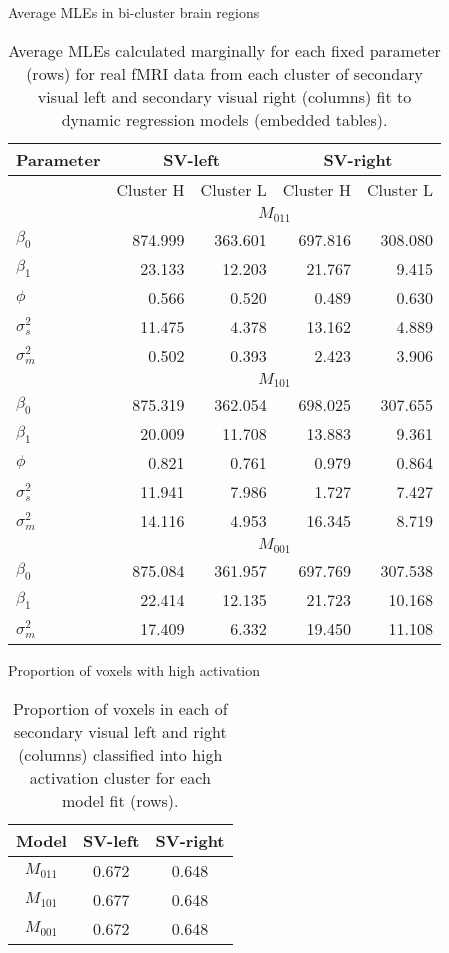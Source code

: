 \begin{table}
\ssp
\centering
\caption{Average MLEs in bi-cluster brain regions} \label{tab:fmri:mle:clusters}
\begin{tabular}{|l|rr|rr|}
\hline
Parameter & \multicolumn{2}{|c|}{SV-left} & \multicolumn{2}{|c|}{SV-right} \\
\hline
 & Cluster H & Cluster L & Cluster H & Cluster L \\
\hline
 & \multicolumn{4}{|c|}{$M_{011}$} \\
\hline
$\beta_0$ & 874.999 & 363.601 & 697.816 & 308.080 \\
$\beta_1$ & 23.133 & 12.203 & 21.767 & 9.415 \\
$\phi$ & 0.566 & 0.520 & 0.489 & 0.630 \\
$\sigma^2_s$ & 11.475 & 4.378 & 13.162 & 4.889 \\
$\sigma^2_m$ & 0.502 & 0.393 & 2.423 & 3.906 \\
\hline
 & \multicolumn{4}{|c|}{$M_{101}$} \\
\hline
$\beta_0$ & 875.319 & 362.054 & 698.025 & 307.655 \\
$\beta_1$ & 20.009 & 11.708 & 13.883 & 9.361 \\
$\phi$ & 0.821 & 0.761 & 0.979 & 0.864 \\
$\sigma^2_s$ & 11.941 & 7.986 & 1.727 & 7.427 \\
$\sigma^2_m$ & 14.116 & 4.953 & 16.345 & 8.719 \\
\hline
 & \multicolumn{4}{|c|}{$M_{001}$} \\
\hline
$\beta_0$ & 875.084 & 361.957 & 697.769 & 307.538 \\
$\beta_1$ & 22.414 & 12.135 & 21.723 & 10.168 \\
$\sigma^2_m$ & 17.409 & 6.332 & 19.450 & 11.108 \\
\hline
\end{tabular}
\caption*{Average MLEs calculated marginally for each fixed parameter (rows) for real fMRI data from each cluster of secondary visual left and secondary visual right (columns) fit to dynamic regression models (embedded tables).}
\end{table}

\begin{table}
\ssp
\centering
\caption{Proportion of voxels with high activation} \label{tab:fmri:prop}
\begin{tabular}{|c|cc|}
\hline
Model & SV-left & SV-right \\
\hline
$M_{011}$ & 0.672 & 0.648 \\
$M_{101}$ & 0.677 & 0.648 \\
$M_{001}$ & 0.672 & 0.648 \\
\hline
\end{tabular}
\caption*{Proportion of voxels in each of secondary visual left and right (columns) classified into high activation cluster for each model fit (rows).}
\end{table}

